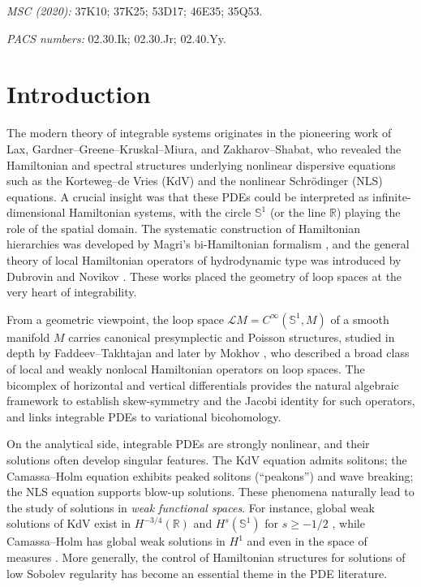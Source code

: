 \documentclass{amsart}
\newcounter{ex}
\newcounter{re}
\begin{document}
\noindent
\emph{MSC (2020): } 37K10; 37K25; 53D17; 46E35; 35Q53.

\noindent 
\emph{PACS numbers:} 02.30.Ik; 02.30.Jr; 02.40.Yy.

\tableofcontents

\section{Introduction}

The modern theory of integrable systems originates in the pioneering work of
Lax, Gardner--Greene--Kruskal--Miura, and Zakharov--Shabat, who revealed the
Hamiltonian and spectral structures underlying nonlinear dispersive equations
such as the Korteweg--de Vries (KdV) and the nonlinear Schrödinger (NLS)
equations. A crucial insight was that these PDEs could be interpreted as
infinite-dimensional Hamiltonian systems, with the circle $\mathbb S^1$ (or the
line $\mathbb R$) playing the role of the spatial domain. The systematic
construction of Hamiltonian hierarchies was developed by Magri’s bi-Hamiltonian
formalism \cite{Magri1978}, and the general theory of local Hamiltonian
operators of hydrodynamic type was introduced by Dubrovin and Novikov
\cite{DubrovinNovikov1983}. These works placed the geometry of loop spaces at
the very heart of integrability.

From a geometric viewpoint, the loop space $\mathcal L M = C^\infty(\mathbb S^1,M)$
of a smooth manifold $M$ carries canonical presymplectic and Poisson structures,
studied in depth by Faddeev--Takhtajan \cite{FaddeevTakhtajan1987} and later by
Mokhov \cite{Mokhov1998,MokhovBook}, who described a broad class of local and
weakly nonlocal Hamiltonian operators on loop spaces. The bicomplex of
horizontal and vertical differentials provides the natural algebraic framework
to establish skew-symmetry and the Jacobi identity for such operators, and
links integrable PDEs to variational bicohomology.

On the analytical side, integrable PDEs are strongly nonlinear, and their
solutions often develop singular features. The KdV equation admits solitons;
the Camassa--Holm equation exhibits peaked solitons (``peakons'') and wave
breaking; the NLS equation supports blow-up solutions. These phenomena naturally
lead to the study of solutions in \emph{weak functional spaces}. For instance,
global weak solutions of KdV exist in $H^{-3/4}(\mathbb R)$ and $H^s(\mathbb S^1)$
for $s\ge -1/2$ \cite{KappelerTopalov2006,KillipVisan2019}, while Camassa--Holm
has global weak solutions in $H^1$ and even in the space of measures
\cite{BressanConstantin2007}. More generally, the control of Hamiltonian
structures for solutions of low Sobolev regularity has become an essential
theme in the PDE literature.
\end{document}
